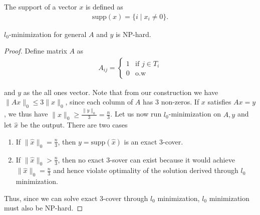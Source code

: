 \documentclass[11pt]{article}
\begin{document}
\begin{definition}
The support of a vector $x$ is defined as
\begin{align*}
\text{supp}(x) = \{i \mid x_i \neq 0 \}.
\end{align*}
\end{definition}

\begin{theorem}
$l_0$-minimization for general $A$ and $y$ is NP-hard.
\end{theorem}
\begin{proof}
Define matrix $A$ as
\begin{align*}
    A_{ij} = \begin{cases}
    1 & \text{if } j \in T_i \\
    0 & \text{o.w}
    \end{cases}
\end{align*}

and $y$ as the all ones vector. Note that from our construction we have $\|Ax\|_0 \leq 3\|x\|_0$, since each column of $A$ has 3 non-zeros. If $x$ satisfies $Ax = y$, we thus have $\|x\|_0 \geq \frac{\|y\|_0}{3} = \frac{n}{3}$. Let us now run $l_0$-minimization on $A, y$ and let $\hat{x}$ be the output. There are two cases

\begin{enumerate}
    \item If $\|\hat{x}\|_0 = \frac{n}{3}$, then $y = \text{supp}(\hat{x})$ is an exact 3-cover. %
    \item If $\| \hat{x}\|_0 > \frac{n}{3}$, then no exact 3-sover can exist because it would achieve $\|\hat{x}\|_0 = \frac{n}{3}$ and hence violate optimality of the solution derived through $l_0$ minimization.
\end{enumerate}

Thus, since we can solve exact 3-cover through $l_0$ minimization, $l_0$ minimization must also be NP-hard.
\end{proof}
\end{document}

